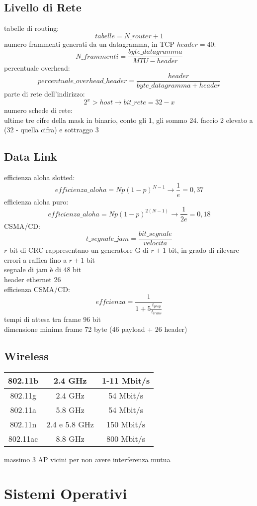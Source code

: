 \documentclass[a4paper,12pt, oneside]{book}
\begin{document}
\section{Livello di Rete}
tabelle di routing:
$$tabelle=N\_router+1$$
numero frammenti generati da un datagramma, in TCP $header=40$:
$$N\_frammenti=\frac{byte\_datagramma}{MTU-header}$$
percentuale overhead:
$$percentuale\_overhead\_header=\frac{header}{byte\_datagramma+header}$$
parte di rete dell'indirizzo:
$$2^x>host\to bit\_rete=32-x$$
numero schede di rete:
\\ ultime tre cifre della mask in binario, conto gli 1, gli sommo 24. faccio 2 elevato a (32 - quella cifra) e sottraggo 3\\
\section{Data Link}
efficienza aloha slotted:
$$efficienza\_aloha=Np(1-p)^{N-1}\to \frac{1}{e}=0,37$$
efficienza aloha puro:
$$efficienza\_aloha=Np(1-p)^{2(N-1)}\to \frac{1}{2e}=0,18$$
CSMA/CD:
$$t\_segnale\_jam=\frac{bit\_segnale}{velocita}$$
$r$ bit di CRC rappresentano un generatore G di
$r + 1$ bit, in grado di rilevare errori a raffica fino
a $r + 1$ bit\\
segnale di jam è di 48 bit\\
header ethernet 26\\
efficienza CSMA/CD:
$$effcienza= \frac{1}{1+5\frac{t_{prop}}{t_{trans}}}$$
tempi di attesa tra frame 96 bit\\
dimensione minima frame 72 byte (46 payload + 26 header)
\section{Wireless}
\begin{center}
\begin{tabular}{|c|c|c|}
\hline
802.11b & 2.4 GHz & 1-11 Mbit/s\\
\hline
802.11g & 2.4 GHz & 54 Mbit/s\\
\hline
802.11a & 5.8 GHz & 54 Mbit/s\\
\hline
802.11n & 2.4 e 5.8 GHz & 150 Mbit/s\\
\hline
802.11ac & 8.8 GHz & 800 Mbit/s\\
\hline
\end{tabular}
\end{center}
massimo 3 AP vicini per non avere interferenza mutua
\chapter{Sistemi Operativi}
\end{document}
